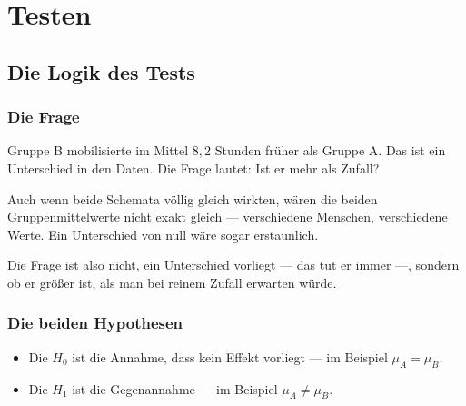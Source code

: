 \part{Testen}

\chapter{Die Logik des Tests}

\section{Die Frage}

Gruppe B mobilisierte im Mittel $8{,}2$ Stunden früher als Gruppe A. Das ist ein Unterschied in den Daten. Die Frage lautet: Ist er mehr als Zufall?

\begin{merksatz}
Auch wenn beide Schemata völlig gleich wirkten, wären die beiden Gruppenmittelwerte nicht exakt gleich --- verschiedene Menschen, verschiedene Werte. Ein Unterschied von null wäre sogar erstaunlich.

\begin{center}
\begin{minipage}{0.9\textwidth}
Die Frage ist also nicht,  ein Unterschied vorliegt --- das tut er immer ---, sondern ob er größer ist, als man bei reinem Zufall erwarten würde.
\end{minipage}
\end{center}
\end{merksatz}

\section{Die beiden Hypothesen}

\begin{definition}
\begin{itemize}[leftmargin=1.4em, itemsep=4pt]
\item Die  $H_0$ ist die Annahme, dass kein Effekt vorliegt --- im Beispiel $\mu_A = \mu_B$.
\item Die  $H_1$ ist die Gegenannahme --- im Beispiel $\mu_A \neq \mu_B$.
\end{itemize}
\end{definition}

